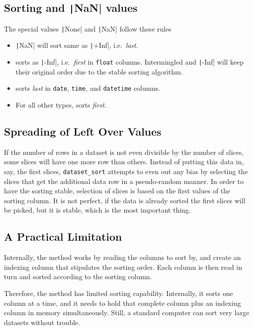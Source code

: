 \subsection{Sorting \pyNone and \texttt|NaN| values}
The special values \texttt|None| and \texttt|NaN| follow these rules
\begin{itemize}
\item \texttt|NaN| will sort same as \texttt|+Inf|, i.e.\ \textsl{last}.
\item \pyNone sorts as \texttt|-Inf|, i.e.\ \textsl{first} in \texttt{float} columns.  Intermingled \pyNone and \texttt|-Inf| will keep their original order due to the stable sorting algorithm.
\item \pyNone sorts \textsl{last} in \texttt{date}, \texttt{time}, and \texttt{datetime} columns.
\item For all other types, \pyNone sorts \textsl{first}.
\end{itemize}


\subsection*{Spreading of Left Over Values}
If the number of rows in a dataset is not even divisible by the number
of slices, some slices will have one more row than others.  Instead of
putting this data in, say, the first slices, \texttt{dataset\_sort}
attempts to even out any bias by selecting the slices that get the
additional data row in a pseudo-random manner.  In order to have the
sorting stable, selection of slices is based on the first values of
the sorting column.  It is not perfect, if the data is already sorted
the first slices will be picked, but it is stable, which is the most
important thing.


\subsection{A Practical Limitation}
Internally, the method works by reading the columns to sort by, and
create an indexing column that stipulates the sorting order.  Each
column is then read in turn and sorted according to the sorting
column.

Therefore, the method has limited sorting capability.  Internally, it
sorts one column at a time, and it needs to hold that complete column
plus an indexing column in memory simultaneously.  Still, a standard
computer can sort very large datasets without trouble.



